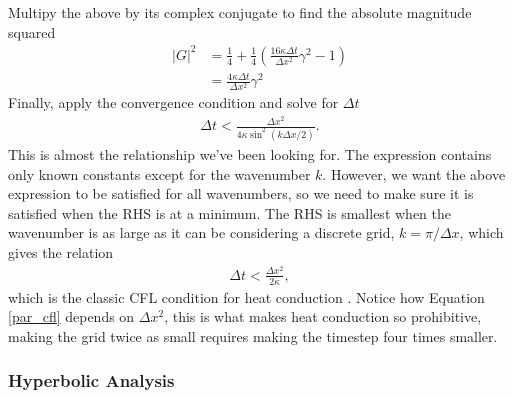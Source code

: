 \documentclass[iop]{emulateapj}
\begin{document}
				Multipy the above by its complex conjugate to find the absolute magnitude squared
				\begin{align}
					|G|^2 &= \frac{1}{4} + \frac{1}{4} \left( \frac{16 \kappa \Delta t}{\Delta x^2} \gamma^2 - 1 \right) \\
					      &= \frac{4 \kappa \Delta t}{\Delta x^2} \gamma^2
				\end{align}
				Finally, apply the convergence condition and solve for $\Delta t$
				\begin{align}
					\Delta t < \frac{\Delta x^2}{4 \kappa \sin^2(k \Delta x / 2)}. \label{par_cfl_2}
				\end{align}
				This is almost the relationship we've been looking for. 
				The expression contains only known constants except for the wavenumber $k$.
				However, we want the above expression to be satisfied for all wavenumbers, so we need to make sure it is satisfied when the \ac{RHS} is at a minimum.
				The \ac{RHS} is smallest when the wavenumber is as large as it can be considering a discrete grid, $k = \pi / \Delta x$, which gives the relation
				\begin{align}
					\Delta t < \frac{\Delta x^2}{2 \kappa}, \label{par_cfl}
				\end{align}
				which is the classic \ac{CFL} condition for heat conduction \cite{cfd_book}.
				Notice how Equation \ref{par_cfl} depends on $\Delta x^2$, this is what makes heat conduction so prohibitive, making the grid twice as small requires making the timestep four times smaller.
			
			\subsubsection{Hyperbolic Analysis}
			
\end{document}
